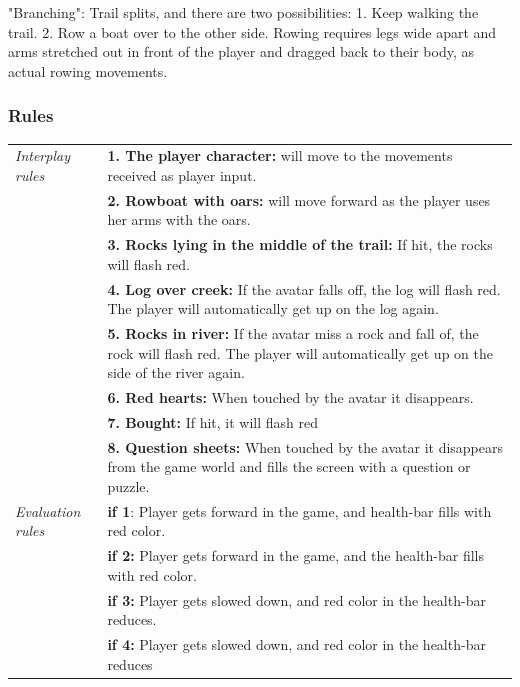 "Branching": Trail splits, and there are two possibilities: 1. Keep walking the trail. 2. Row a boat over to the other side. Rowing requires legs wide apart and arms stretched out in front of the player and dragged back to their body, as actual rowing movements. 

\subsubsection{Rules} 
 
\begin{table} [H]
\centering
    \begin{tabular}{|p{}|p{}|}
       \hline
	   \emph{Interplay rules} & \textbf{1. The player character:} will move to the movements received as player input. \\ \cline{2-2}
	     & \textbf{2. Rowboat with oars:} will move forward as the player  uses her arms with the oars. \\ \cline{2-2}
	       & \textbf{3. Rocks lying in the middle of the trail:} If hit, the  rocks will flash red.  \\ \cline{2-2}
	        & \textbf{4. Log over creek:} If the avatar falls off, the log will flash red. The player will automatically get up on the log again. \\ \cline{2-2}
	        & \textbf{5. Rocks in river:} If the avatar miss a rock and fall of, the rock will flash red. The player will automatically get up on the side of the river again. \\ \cline{2-2}
	         &  \textbf{6. Red hearts:} When touched by the avatar it disappears. \\ \cline{2-2}
	          &  \textbf{7. Bought:} If hit, it will flash red \\ \cline{2-2}
	           &  \textbf{8. Question sheets:} When touched by the avatar  it  disappears from the game world and fills the screen with  a  question or puzzle. \\ \hline
	            \emph{Evaluation rules} & \textbf{if 1}: Player gets forward in the game, and health-bar fills with red color. \\ \cline{2-2}
	               & \textbf{if 2:} Player gets forward in the game, and the health-bar fills with red color.   \\ \cline{2-2}
	               & \textbf{if 3:} Player gets slowed down, and red color in the health-bar reduces.   \\ \cline{2-2}
	               & \textbf{if 4:} Player gets slowed down, and red color in the health-bar reduces   \\ \cline{2-2}

\end{tabular}
\end{table}
